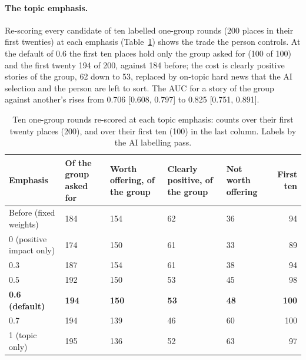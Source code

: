 \paragraph{The topic emphasis.} Re-scoring every candidate of ten
labelled one-group rounds (200 places in their first twenties) at each
emphasis (Table~\ref{tab:emphasis}) shows the trade the person controls.
At the default of 0.6 the first ten places hold only the group asked
for (100 of 100) and the first twenty 194 of 200, against 184 before;
the cost is clearly positive stories of the group, 62 down to 53,
replaced by on-topic hard news that the AI selection and the person
are left to sort. The AUC for a story of the group against another's
rises from 0.706 [0.608, 0.797] to 0.825 [0.751, 0.891].

\begin{table}[ht]
\centering
\small
\caption{Ten one-group rounds re-scored at each topic emphasis: counts
over their first twenty places (200), and over their first ten (100)
in the last column. Labels by the AI labelling pass.}
\label{tab:emphasis}
\begin{tabularx}{\linewidth}{@{}lXXXXr@{}}
\toprule
\textbf{Emphasis} & \textbf{Of the group asked for} & \textbf{Worth
offering, of the group} & \textbf{Clearly positive, of the group} &
\textbf{Not worth offering} & \textbf{First ten} \\
\midrule
Before (fixed weights) & 184 & 154 & 62 & 36 & 94 \\
0 (positive impact only) & 174 & 150 & 61 & 33 & 89 \\
0.3 & 187 & 154 & 61 & 38 & 94 \\
0.5 & 192 & 150 & 53 & 45 & 98 \\
\textbf{0.6 (default)} & \textbf{194} & \textbf{150} & \textbf{53} &
\textbf{48} & \textbf{100} \\
0.7 & 194 & 139 & 46 & 60 & 100 \\
1 (topic only) & 195 & 136 & 52 & 63 & 97 \\
\bottomrule
\end{tabularx}
\end{table}

